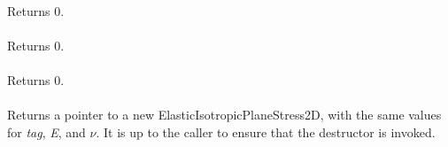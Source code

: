  \\
Returns $0$. \\

 \\
Returns $0$. \\

 \\
Returns $0$. \\

 \\
Returns a pointer to a new ElasticIsotropicPlaneStress2D, with the
same values for {\em tag}, {\em E}, and $\nu$. It is up to the
caller to ensure that the destructor is invoked. \\